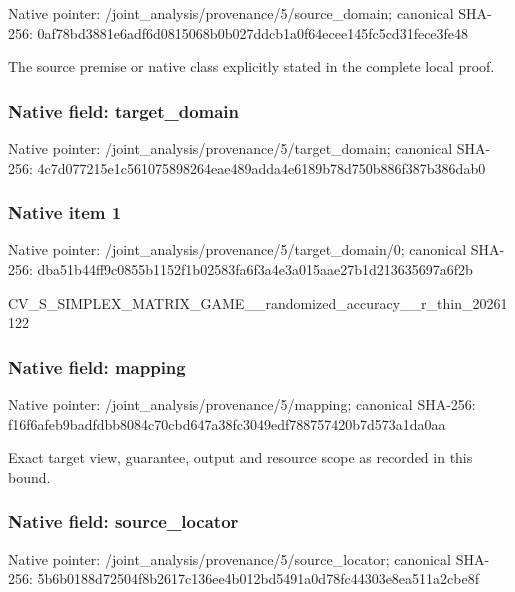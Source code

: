 \documentclass[10pt,a4paper]{article}
\begin{document}
Native pointer: /joint\_analysis/provenan\allowbreak{}ce/5/source\_domain; canonical SHA-256: 0af78bd3881e6adf6d081506\allowbreak{}8b0b027ddcb1a0f64ecee145\allowbreak{}fc5cd31fece3fe48


The source premise or native class explicitly stated in the complete local proof.


\subsubsection{Native field: target\_domain}


Native pointer: /joint\_analysis/provenan\allowbreak{}ce/5/target\_domain; canonical SHA-256: 4c7d077215e1c56107589826\allowbreak{}4eae489adda4e6189b78d750\allowbreak{}b886f387b386dab0



\subsubsection{Native item 1}


Native pointer: /joint\_analysis/provenan\allowbreak{}ce/5/target\_domain/0; canonical SHA-256: dba51b44ff9c0855b1152f1b\allowbreak{}02583fa6f3a4e3a015aae27b\allowbreak{}1d213635697a6f2b


CV\_S\_SIMPLEX\_MATRIX\_GAME\allowbreak{}\_\_randomized\_accuracy\_\_r\allowbreak{}\_thin\_20261122


\subsubsection{Native field: mapping}


Native pointer: /joint\_analysis/provenance/5/mapping; canonical SHA-256: f16f6afeb9badfdbb8084c70\allowbreak{}cbd647a38fc3049edf788757\allowbreak{}420b7d573a1da0aa


Exact target view, guarantee, output and resource scope as recorded in this bound.


\subsubsection{Native field: source\_locator}


Native pointer: /joint\_analysis/provenan\allowbreak{}ce/5/source\_locator; canonical SHA-256: 5b6b0188d72504f8b2617c13\allowbreak{}6ee4b012bd5491a0d78fc443\allowbreak{}03e8ea511a2cbe8f
\end{document}
